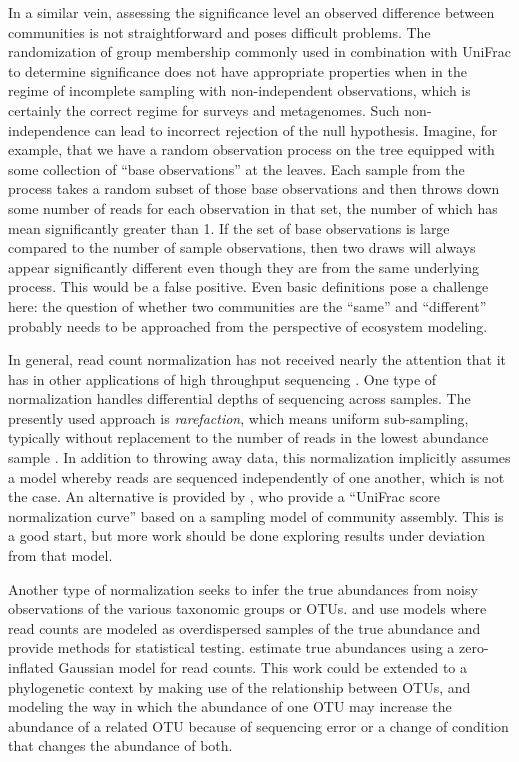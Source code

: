 \documentclass{amsart}
\begin{document}
In a similar vein, assessing the significance level an observed difference between communities is not straightforward and poses difficult problems.
The randomization of group membership commonly used in combination with UniFrac to determine significance does not have appropriate properties when in the regime of incomplete sampling with non-independent observations, which is certainly the correct regime for surveys and metagenomes.
Such non-independence can lead to incorrect rejection of the null hypothesis.
Imagine, for example, that we have a random observation process on the tree equipped with some collection of ``base observations'' at the leaves.
Each sample from the process takes a random subset of those base observations and then throws down some number of reads for each observation in that set, the number of which has mean significantly greater than 1.
If the set of base observations is large compared to the number of sample observations, then two draws will always appear significantly different even though they are from the same underlying process.
This would be a false positive.
Even basic definitions pose a challenge here: the question of whether two communities are the ``same'' and ``different'' probably needs to be approached from the perspective of ecosystem modeling.

In general, read count normalization has not received nearly the attention that it has in other applications of high throughput sequencing \citep[such as RNA-Seq, e.g.][]{anders2010differential,robinson2010edger}.
One type of normalization handles differential depths of sequencing across samples.
The presently used approach is \textit{rarefaction}, which means uniform sub-sampling, typically without replacement to the number of reads in the lowest abundance sample \citep{caporaso2010qiime,schloss2009introducing}.
In addition to throwing away data, this normalization implicitly assumes a model whereby reads are sequenced independently of one another, which is not the case.
An alternative is provided by \citet{o2012phylogenetic}, who provide a ``UniFrac score normalization curve'' based on a sampling model of community assembly.
This is a good start, but more work should be done exploring results under deviation from that model.

Another type of normalization seeks to infer the true abundances from noisy observations of the various taxonomic groups or OTUs.
\citet{holmes2012dirichlet} and \citet{la2012hypothesis} use models where read counts are modeled as overdispersed samples of the true abundance and provide methods for statistical testing.
\citet{paulson2013differential} estimate true abundances using a zero-inflated Gaussian model for read counts.
This work could be extended to a phylogenetic context by making use of the relationship between OTUs, and modeling the way in which the abundance of one OTU may increase the abundance of a related OTU because of sequencing error or a change of condition that changes the abundance of both.
\end{document}
